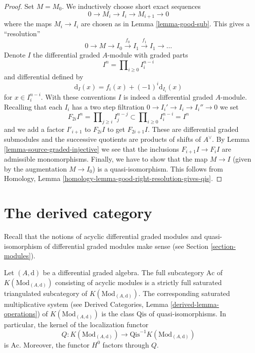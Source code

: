 \begin{proof}
Set $M = M_0$. We inductively choose short exact sequences
$$
0 \to M_i \to I_i \to M_{i + 1} \to 0
$$
where the maps $M_i \to I_i$ are chosen as in Lemma \ref{lemma-good-sub}.
This gives a ``resolution''
$$
0 \to M \to I_0 \xrightarrow{f_0} I_1 \xrightarrow{f_1} I_1 \to \ldots
$$
Denote $I$ the differential graded $A$-module with graded parts
$$
I^n = \prod\nolimits_{i \geq 0} I^{n - i}_i
$$
and differential defined by
$$
\text{d}_I(x) = f_i(x) + (-1)^i \text{d}_{I_i}(x)
$$
for $x \in I_i^{n - i}$. With these conventions $I$ is indeed a differential
graded $A$-module. Recalling that each $I_i$ has a two step filtration
$0 \to I_i' \to I_i \to I_i'' \to 0$ we set
$$
F_{2i}I^n = \prod\nolimits_{j \geq i} I^{n - j}_j
\subset
\prod\nolimits_{i \geq 0} I^{n - i}_i = I^n
$$
and we add a factor $I'_{i + 1}$ to $F_{2i}I$ to get $F_{2i + 1}I$.
These are differential graded submodules and the successive quotients
are products of shifts of $A^\vee$. By
Lemma \ref{lemma-source-graded-injective} we see that
the inclusions $F_{i + 1}I \to F_iI$ are admissible monomorphisms.
Finally, we have to show that the map $M \to I$ (given by the
augmentation $M \to I_0$) is a quasi-isomorphism. This follows from
Homology, Lemma \ref{homology-lemma-good-right-resolution-gives-qis}.
\end{proof}






\section{The derived category}
\label{section-derived}

\noindent
Recall that the notions of acyclic differential graded modules
and quasi-isomorphism of differential graded modules make sense
(see Section \ref{section-modules}).

\begin{lemma}
\label{lemma-acyclic}
Let $(A, \text{d})$ be a differential graded algebra.
The full subcategory $\text{Ac}$ of $K(\text{Mod}_{(A, \text{d})})$
consisting of acyclic modules is a strictly full saturated triangulated
subcategory of $K(\text{Mod}_{(A, \text{d})})$.
The corresponding saturated multiplicative system
(see Derived Categories, Lemma \ref{derived-lemma-operations})
of $K(\text{Mod}_{(A, \text{d})})$ is the class $\text{Qis}$
of quasi-isomorphisms. In particular, the kernel of the localization
functor
$$
Q : K(\text{Mod}_{(A, \text{d})}) \to
\text{Qis}^{-1}K(\text{Mod}_{(A, \text{d})})
$$
is $\text{Ac}$. Moreover, the functor $H^0$ factors through $Q$.
\end{lemma}


